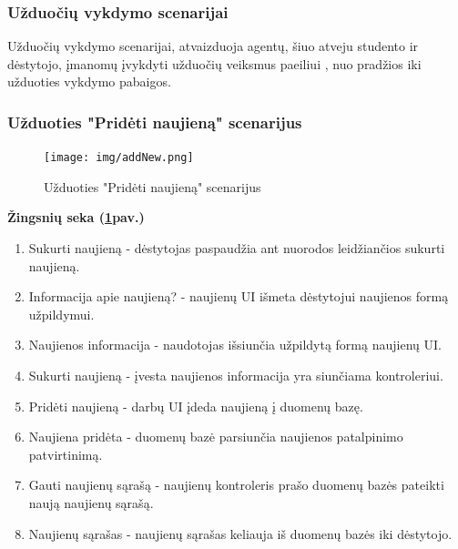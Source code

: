 \documentclass{VUMIFPSkursinis}
\begin{document}
\subsubsection{Užduočių vykdymo scenarijai}
Užduočių vykdymo scenarijai, atvaizduoja agentų, šiuo atveju studento ir dėstytojo, įmanomų įvykdyti užduočių veiksmus paeiliui , nuo pradžios iki užduoties vykdymo pabaigos.
\subsubsection{Užduoties "Pridėti naujieną" scenarijus}
\begin{figure}[H]
	\centering
	\texttt{[image: img/addNew.png]}
	\caption{Užduoties "Pridėti naujieną" scenarijus}
	\label{fig:addNew}
\end{figure}
\textbf{Žingsnių seka (\ref{fig:addNew}pav.)}\\
\begin{enumerate}
	\item Sukurti naujieną - dėstytojas paspaudžia ant nuorodos leidžiančios sukurti naujieną.
	\item Informacija apie naujieną? - naujienų UI išmeta dėstytojui naujienos formą užpildymui.
	\item Naujienos informacija - naudotojas išsiunčia užpildytą formą naujienų UI.
	\item Sukurti naujieną - įvesta naujienos informacija yra siunčiama kontroleriui.
	\item Pridėti naujieną - darbų UI įdeda naujieną į duomenų bazę.
	\item Naujiena pridėta - duomenų bazė parsiunčia naujienos patalpinimo patvirtinimą.
	\item Gauti naujienų sąrašą - naujienų kontroleris prašo duomenų bazės pateikti naują naujienų sąrašą.
	\item Naujienų sąrašas - naujienų sąrašas keliauja iš duomenų bazės iki dėstytojo.
\end{enumerate}
\end{document}

